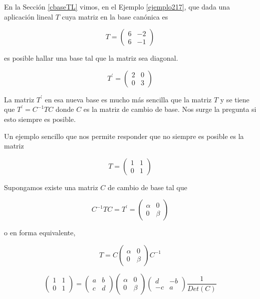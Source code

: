 En  la Sección \ref{cbaseTL} vimos, en el  Ejemplo \ref{ejemplo217}, que dada una aplicación lineal $T$ cuya matriz en la base canónica es 

$$T=\left(\begin{array}{cc}  6 & -2  \\ 6 &  -1
\end{array}
 \right)$$

\bigskip

\noindent
es posible hallar  una base tal que la matriz sea diagonal. 


$$T^\prime=\left(\begin{array}{cc}  2 & 0  \\ 0 &  3
\end{array}
\right)$$

\bigskip


La matriz $T^\prime$ en esa nueva base es mucho más sencilla que la matriz $T$ y se tiene que $T^\prime=C^{-1}TC$  donde $C$ es la matriz de cambio de base.
Nos surge  la pregunta si esto siempre es posible.


\bigskip


Un ejemplo sencillo que nos permite responder que no siempre es posible es la matriz 

$$T=\left(\begin{array}{cc}  1 & 1  \\ 0 &  1
\end{array}
 \right)$$

\bigskip


Supongamos existe una matriz $C$ de cambio de base  tal que 

\bigskip

$$C^{-1}TC=T^\prime=\left(\begin{array}{cc}  \alpha & 0  \\ 0 &  \beta
\end{array}
 \right)$$
 
\bigskip
\noindent
o en forma equivalente,

$$T=C\left(\begin{array}{cc}  \alpha & 0  \\ 0 &  \beta
\end{array}
 \right)C^{-1}$$ 


\bigskip

$$\left(\begin{array}{cc}  1 & 1  \\ 0 &  1
\end{array}
 \right)= \left(\begin{array}{cc}  a & b  \\ c &  d
\end{array}
 \right) \left(\begin{array}{cc}  \alpha & 0  \\0 &  \beta
\end{array}
 \right) \left(\begin{array}{cc}  d & -b  \\ -c &  a
\end{array}
 \right) \frac{1} {Det(C)}$$


